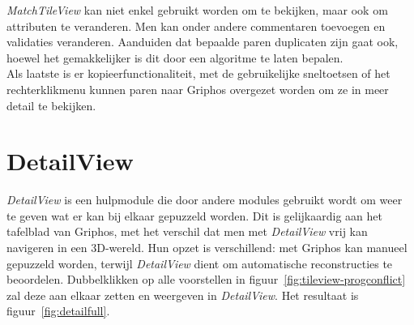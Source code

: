 \emph{MatchTileView} kan niet enkel gebruikt worden om te bekijken, maar ook om attributen te veranderen. Men kan onder andere commentaren toevoegen en validaties veranderen. Aanduiden dat bepaalde paren duplicaten zijn gaat ook, hoewel het gemakkelijker is dit door een algoritme te laten bepalen.\\

Als laatste is er kopieerfunctionaliteit, met de gebruikelijke sneltoetsen of het rechterklikmenu kunnen paren naar Griphos overgezet worden om ze in meer detail te bekijken.

\section{DetailView}
\label{sec:detailview}

\emph{DetailView} is een hulpmodule die door andere modules gebruikt wordt om weer te geven wat er kan bij elkaar gepuzzeld worden. Dit is gelijkaardig aan het tafelblad van Griphos, met het verschil dat men met \emph{DetailView} vrij kan navigeren in een 3D-wereld. Hun opzet is verschillend: met Griphos kan manueel gepuzzeld worden, terwijl \emph{DetailView} dient om automatische reconstructies te beoordelen. Dubbelklikken op alle voorstellen in figuur~\ref{fig:tileview-progconflict} zal deze aan elkaar zetten en weergeven in \emph{DetailView}. Het resultaat is figuur~\ref{fig:detailfull}.\\

